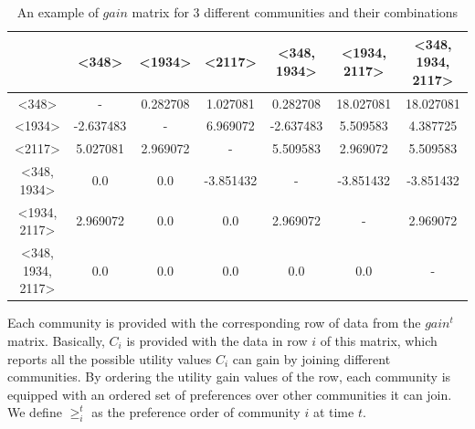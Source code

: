 \begin{table}[ht]
\footnotesize
\caption{An example of $gain$ matrix for 3 different communities and their combinations} %
\centering %
{\renewcommand{\arraystretch}{1.2}
\begin{tabular}{c|c c c c c c} %
\hline\hline %
 & \textless348\textgreater & \textless1934\textgreater & \textless2117\textgreater & \textless348, 1934\textgreater & \textless1934, 2117\textgreater & \textless348, 1934, 2117\textgreater \\ [0.5ex] %
\hline %
\textless348\textgreater & - & 0.282708 & 1.027081 & 0.282708 & 18.027081 & 18.027081 \\
\textless1934\textgreater & -2.637483 & - & 6.969072 & -2.637483 & 5.509583 & 4.387725 \\
\textless2117\textgreater & 5.027081 & 2.969072 & - & 5.509583 & 2.969072 & 5.509583 \\
\textless348, 1934\textgreater & 0.0 & 0.0 & -3.851432 & - & -3.851432 & -3.851432 \\
\textless1934, 2117\textgreater & 2.969072 & 0.0 & 0.0 & 2.969072 & - & 2.969072 \\
\textless348, 1934, 2117\textgreater & 0.0 & 0.0 & 0.0 & 0.0 & 0.0 & - \\ [1ex] %
\hline %
\end{tabular}
}
\label{table:nonlin} %
\end{table}

Each community is provided with the corresponding row of data from the $gain^t$ matrix. Basically, $C_i$ is provided with the data in row $i$ of this matrix, which reports all the possible utility values $C_i$ can gain by joining different communities. By ordering the utility gain values of the row, each community is equipped with an ordered set of preferences over other communities it can join. We define $\geq_{i}^t$ as the preference order of community $i$ at time $t$.

